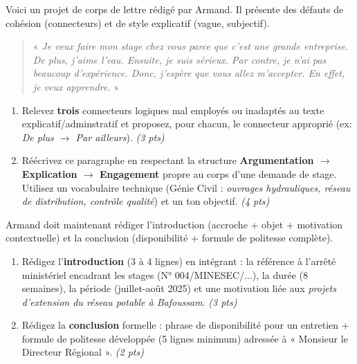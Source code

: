 \documentclass[11pt]{article}
\begin{document}
\begin{exercice}
Voici un projet de corps de lettre rédigé par Armand. Il présente des défauts de cohésion (connecteurs) et de style explicatif (vague, subjectif).

\begin{quote}
« \textit{Je veux faire mon stage chez vous parce que c'est une grande entreprise. De plus, j'aime l'eau. Ensuite, je suis sérieux. Par contre, je n'ai pas beaucoup d'expérience. Donc, j'espère que vous allez m'accepter. En effet, je veux apprendre. } »
\end{quote}

\begin{enumerate}
    \item Relevez \textbf{trois} connecteurs logiques mal employés ou inadaptés au texte explicatif/adminstratif et proposez, pour chacun, le connecteur approprié (ex: \textit{De plus $\rightarrow$ Par ailleurs}). \textit{(3 pts)}
    \item Réécrivez ce paragraphe en respectant la structure \textbf{Argumentation $\rightarrow$ Explication $\rightarrow$ Engagement} propre au corps d'une demande de stage. Utilisez un vocabulaire technique (Génie Civil : \textit{ouvrages hydrauliques, réseau de distribution, contrôle qualité}) et un ton objectif. \textit{(4 pts)}
\end{enumerate}
\end{exercice}

\begin{exercice}
Armand doit maintenant rédiger l'introduction (accroche + objet + motivation contextuelle) et la conclusion (disponibilité + formule de politesse complète).

\begin{enumerate}
    \item Rédigez l'\textbf{introduction} (3 à 4 lignes) en intégrant : la référence à l'arrêté ministériel encadrant les stages (N° 004/MINESEC/...), la durée (8 semaines), la période (juillet-août 2025) et une motivation liée aux \textit{projets d'extension du réseau potable à Bafoussam}. \textit{(3 pts)}
    \item Rédigez la \textbf{conclusion} formelle : phrase de disponibilité pour un entretien + formule de politesse développée (5 lignes minimum) adressée à « Monsieur le Directeur Régional ». \textit{(2 pts)}
\end{enumerate}
\end{exercice}
\end{document}

